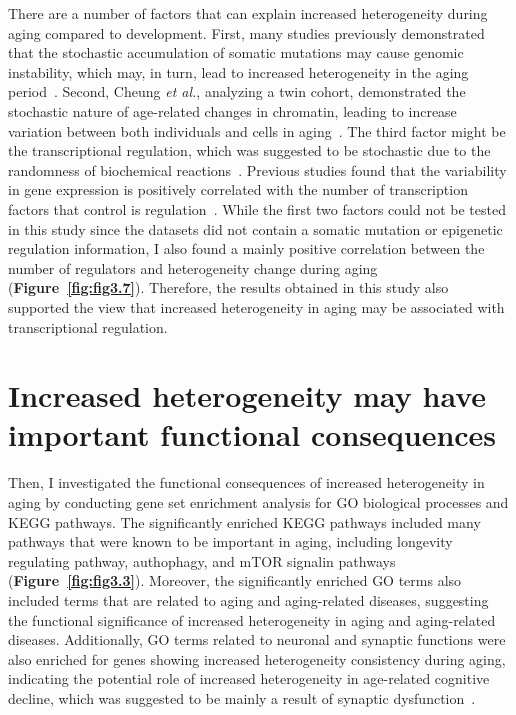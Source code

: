 There are a number of factors that can explain increased heterogeneity during aging compared to development.
First, many studies previously demonstrated that the stochastic accumulation of somatic mutations may cause genomic instability,
which may, in turn, lead to increased heterogeneity in the aging period~\cite{Lu2004, Vijg2004, Lodato2018, Lombard2005}.
Second, Cheung \textit{et al.}, analyzing a twin cohort, demonstrated the stochastic nature of age-related changes in chromatin,
leading to increase variation between both individuals and cells in aging~\cite{Cheung2018}.
The third factor might be the transcriptional regulation, which was suggested to be stochastic due to the randomness of biochemical reactions~\cite{Maheshri2007, Barroso2018}.
Previous studies found that the variability in gene expression is positively correlated with the number of transcription factors that control is regulation~\cite{Barroso2018, Sharon2014}.
While the first two factors could not be tested in this study since the datasets did not contain a somatic mutation or epigenetic regulation information, 
I also found a mainly positive correlation between the number of regulators and heterogeneity change during aging (\textbf{Figure~\ref{fig:fig3.7}}).
Therefore, the results obtained in this study also supported the view that increased heterogeneity in aging may be associated with transcriptional regulation.

\section{Increased heterogeneity may have important functional consequences}
Then, I investigated the functional consequences of increased heterogeneity in aging by conducting gene set enrichment analysis for GO biological processes and KEGG pathways.
The significantly enriched KEGG pathways included many pathways that were known to be important in aging,
including longevity regulating pathway, authophagy, and mTOR signalin pathways (\textbf{Figure~\ref{fig:fig3.3}}).
Moreover, the significantly enriched GO terms also included terms that are related to aging and aging-related diseases,
suggesting the functional significance of increased heterogeneity in aging and aging-related diseases.
Additionally, GO terms related to neuronal and synaptic functions were also enriched for genes showing increased heterogeneity consistency during aging,
indicating the potential role of increased heterogeneity in age-related cognitive decline, which was suggested to be mainly a result of synaptic dysfunction~\cite{Morrison2012}.

